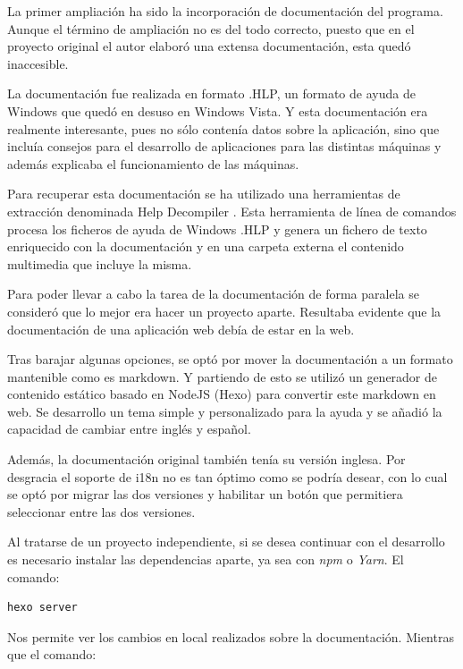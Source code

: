 
La primer ampliación ha sido la incorporación de documentación del programa. Aunque el
término de ampliación no es del todo correcto, puesto que en el proyecto original el autor
elaboró una extensa documentación, esta quedó inaccesible.

\bigskip
La documentación fue realizada en formato .HLP, un formato de ayuda de Windows que quedó
en desuso en Windows Vista. Y esta documentación era realmente interesante, pues no sólo
contenía datos sobre la aplicación, sino que incluía consejos para el desarrollo de 
aplicaciones para las distintas máquinas y además explicaba el funcionamiento de las máquinas.

\bigskip
Para recuperar esta documentación se ha utilizado una herramientas de extracción denominada
Help Decompiler \cite{helpdecompiler}. Esta herramienta de línea de comandos procesa los ficheros de ayuda de
Windows .HLP y genera un fichero de texto enriquecido con la documentación y en una carpeta
externa el contenido multimedia que incluye la misma.

\bigskip
Para poder llevar a cabo la tarea de la documentación de forma paralela se consideró que lo mejor era
hacer un proyecto aparte. Resultaba evidente que la documentación de una aplicación web debía de estar en la
web. 

\bigskip
Tras barajar algunas opciones, se optó por mover la documentación a un formato mantenible como 
es markdown. Y partiendo de esto se utilizó un generador de contenido estático basado en NodeJS (Hexo)
para convertir este markdown en web. Se desarrollo un tema simple y personalizado para la ayuda y se 
añadió la capacidad de cambiar entre inglés y español.

\bigskip
Además, la documentación original también tenía su versión inglesa. Por desgracia el soporte de i18n no
es tan óptimo como se podría desear, con lo cual se optó por migrar las dos versiones y habilitar un botón
que permitiera seleccionar entre las dos versiones.

\bigskip
Al tratarse de un proyecto independiente, si se desea continuar con el desarrollo es necesario instalar las dependencias
aparte, ya sea con \textit{npm} o \textit{Yarn}. El comando:

\begin{lstlisting}
hexo server
\end{lstlisting}

\bigskip
Nos permite ver los cambios en local realizados sobre la documentación. Mientras que el comando:

